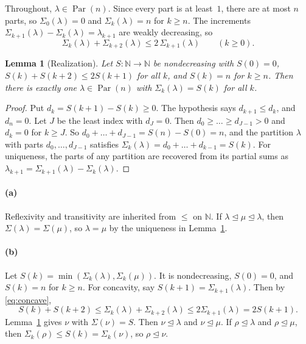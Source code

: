 \documentclass[11pt]{article}
\theoremstyle{plain}
\newtheorem{lemma}[theorem]{Lemma}
\theoremstyle{definition}
\theoremstyle{remark}
\newcommand{\Par}{\operatorname{Par}}
\newcommand{\dom}{\trianglelefteq}
\begin{document}
Throughout, $\lambda\in\Par(n)$. Since every part is at least~$1$, there are at
most $n$ parts, so $\Sigma_0(\lambda)=0$ and $\Sigma_k(\lambda)=n$ for
$k\ge n$. The increments $\Sigma_{k+1}(\lambda)-\Sigma_k(\lambda)=\lambda_{k+1}$
are weakly decreasing, so
\begin{equation}\label{eq:concave}
  \Sigma_k(\lambda)+\Sigma_{k+2}(\lambda)\le2\,\Sigma_{k+1}(\lambda)\qquad(k\ge0).
\end{equation}

\begin{lemma}[Realization]\label{lem:real}
Let $S:\mathbb N\to\mathbb N$ be nondecreasing with $S(0)=0$,
$S(k)+S(k+2)\le2S(k+1)$ for all $k$, and $S(k)=n$ for $k\ge n$. Then there is
exactly one $\lambda\in\Par(n)$ with $\Sigma_k(\lambda)=S(k)$ for all $k$.
\end{lemma}

\begin{proof}
Put $d_k=S(k+1)-S(k)\ge0$. The hypothesis says $d_{k+1}\le d_k$, and
$d_n=0$. Let $J$ be the least index with $d_J=0$. Then
$d_0\ge\dots\ge d_{J-1}>0$ and $d_k=0$ for $k\ge J$. So
$d_0+\dots+d_{J-1}=S(n)-S(0)=n$, and the partition $\lambda$ with parts
$d_0,\dots,d_{J-1}$ satisfies $\Sigma_k(\lambda)=d_0+\dots+d_{k-1}=S(k)$.
For uniqueness, the parts of any partition are recovered from its partial sums
as $\lambda_{k+1}=\Sigma_{k+1}(\lambda)-\Sigma_k(\lambda)$.
\end{proof}

\paragraph{(a)} Reflexivity and transitivity are inherited from $\le$ on
$\mathbb N$. If $\lambda\dom\mu\dom\lambda$, then $\Sigma(\lambda)=\Sigma(\mu)$,
so $\lambda=\mu$ by the uniqueness in Lemma~\ref{lem:real}.

\paragraph{(b)} Let $S(k)=\min(\Sigma_k(\lambda),\Sigma_k(\mu))$. It is
nondecreasing, $S(0)=0$, and $S(k)=n$ for $k\ge n$. For concavity, say
$S(k+1)=\Sigma_{k+1}(\lambda)$. Then by \eqref{eq:concave},
\[
  S(k)+S(k+2)\le\Sigma_k(\lambda)+\Sigma_{k+2}(\lambda)\le2\Sigma_{k+1}(\lambda)
  =2S(k+1).
\]
Lemma~\ref{lem:real} gives $\nu$ with $\Sigma(\nu)=S$. Then $\nu\dom\lambda$ and
$\nu\dom\mu$. If $\rho\dom\lambda$ and $\rho\dom\mu$, then
$\Sigma_k(\rho)\le S(k)=\Sigma_k(\nu)$, so $\rho\dom\nu$.
\end{document}
